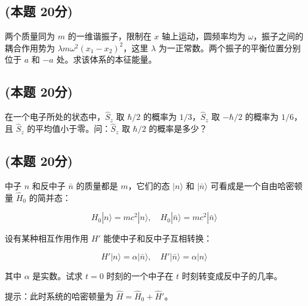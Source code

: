 \subsection{(本题 20分)}
两个质量同为 $m$ 的一维谐振子，限制在 $x$ 轴上运动，圆频率均为 $\omega$，振子之间的耦合作用势为 $\lambda m \omega^2 (x_1 - x_2)^2$，这里 $\lambda$ 为一正常数。两个振子的平衡位置分别位于 $a$ 和 $-a$ 处。求该体系的本征能量。
\subsection{(本题 20分)}
在一个电子所处的状态中，$\hat S_z$ 取 $\hbar/2$ 的概率为 $1/3$，$\hat S_z$ 取 $-\hbar/2$ 的概率为 $1/6$，且 $\hat S_z$ 的平均值小于零。问：$\hat S_z$ 取 $\hbar/2$ 的概率是多少？
\subsection{(本题 20分)}
中子 $n$ 和反中子 $\bar{n}$ 的质量都是 $m$，它们的态 $|n\rangle$ 和 $|\bar{n}\rangle$ 可看成是一个自由哈密顿量 $\hat H_0$ 的简并态：

$$H_0|n\rangle = mc^2|n\rangle, \quad H_0|\bar{n}\rangle = mc^2|\bar{n}\rangle~$$

设有某种相互作用作用 $H'$ 能使中子和反中子互相转换：

$$H'|n\rangle = \alpha|\bar{n}\rangle, \quad H'|\bar{n}\rangle = \alpha|n\rangle~$$

其中 $\alpha$ 是实数。试求 $t=0$ 时刻的一个中子在 $t$ 时刻转变成反中子的几率。

提示：此时系统的哈密顿量为 $\hat{H} = \hat{H}_0 + \hat{H}'$。
